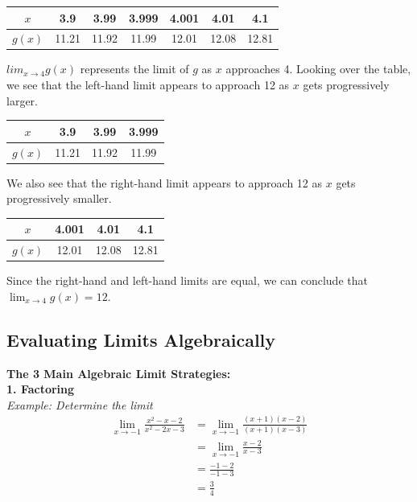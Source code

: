 \documentclass{article}
\begin{document}
            \begin{tabular}{ccccccc}
                $x$ & 3.9 & 3.99 & 3.999 & 4.001 & 4.01 & 4.1 \\
                \hline
                $g(x)$ & 11.21 & 11.92 & 11.99 & 12.01 & 12.08 & 12.81
            \end{tabular}

            \noindent $lim_{x\to 4}g(x)$ represents the limit of $g$ as $x$ approaches
            4. Looking over the table, we see that the left-hand limit appears to approach 12 as
            $x$ gets progressively larger. \\

            \begin{tabular}{cccc}
                $x$ & 3.9 & 3.99 & 3.999 \\
                \hline
                $g(x)$ & 11.21 & 11.92 & 11.99
            \end{tabular}

            \noindent We also see that the right-hand limit appears to approach 12 as $x$ gets
            progressively smaller. \\

            \begin{tabular}{cccc}
                $x$ & 4.001 & 4.01 & 4.1 \\
                \hline
                $g(x)$ & 12.01 & 12.08 & 12.81
            \end{tabular}

            \noindent Since the right-hand and left-hand limits are equal, we can conclude
            that $\lim_{x\to 4}g(x)=12$.


        \subsection{Evaluating Limits Algebraically}
            \color{purple} \textbf{The 3 Main Algebraic Limit Strategies:} \color{black} \\
            \noindent \color{purple} \textbf{1. Factoring} \color{blue} \\
            \textit{Example: Determine the limit} \color{black} \\

            \begin{align*}
                \lim_{x\to -1}\frac{x^2-x-2}{x^2-2x-3} &= \lim_{x\to -1}\frac{(x+1)(x-2)}{(x+1)(x-3)} \\
                &= \lim_{x\to -1}\frac{x-2}{x-3} \\
                &= \frac{-1-2}{-1-3} \\
                &= \frac{3}{4}
            \end{align*}
\end{document}
